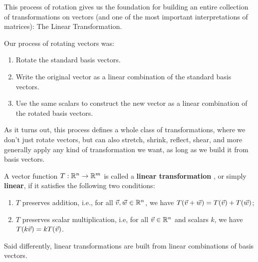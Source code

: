 \documentclass{ximera}
\begin{document}
    \begin{remark}

        This process of rotation gives us the foundation for building an entire collection of transformations on vectors (and one of the most important interpretations of matrices): The Linear Transformation.

        Our process of rotating vectors was:

        \begin{enumerate}

            \item Rotate the standard basis vectors.
        
            \item Write the original vector as a linear combination of the standard basis vectors.
            
            \item Use the same scalars to construct the new vector as a linear combination of the rotated basis vectors.
            
        \end{enumerate}

        As it turns out, this process defines a whole class of transformations, where we don't just rotate vectors, but can also stretch, shrink, reflect, shear, and more generally apply any kind of transformation we want, as long as we build it from basis vectors.

    \end{remark}

        \begin{definition}

            A vector function $T:\mathbb{R}^n\to \mathbb{R}^m$ is called a \textbf{linear
              transformation}%
            , or simply \textbf{linear}, if it
            satisfies the following two conditions:
            \begin{enumerate}
            \item $T$ preserves addition, i.e., for all\/
              $\vec{v},\vec{w}\in\mathbb{R}^n$, we have
              $T(\vec{v}+\vec{w}) = T(\vec{v}) + T(\vec{w})$;
            \item $T$ preserves scalar multiplication, i.e, for all\/
              $\vec{v}\in\mathbb{R}^n$ and scalars $k$, we have
              $T(k\vec{v}) = kT(\vec{v})$.
            \end{enumerate}

            Said differently, linear transformations are built from linear combinations of basis vectors.
          \end{definition}
\end{document}
